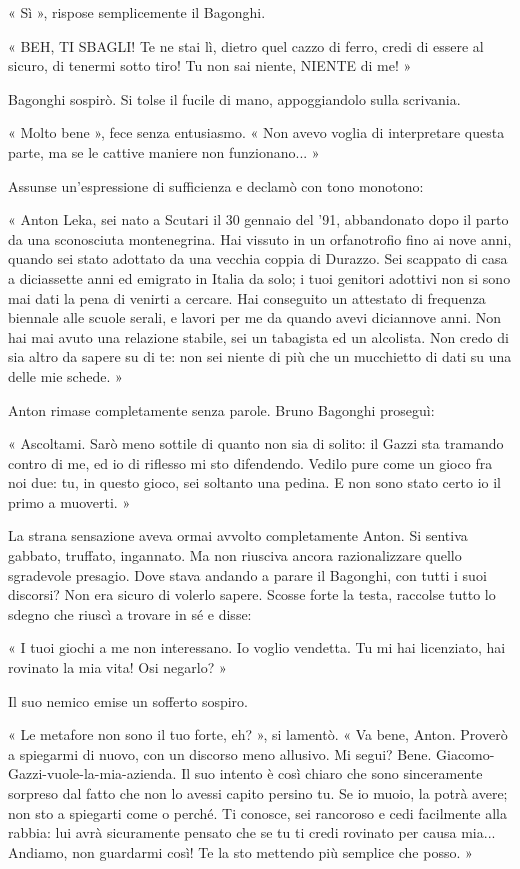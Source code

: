 « Sì », rispose semplicemente il Bagonghi.

« BEH, TI SBAGLI! Te ne stai lì, dietro quel cazzo di ferro, credi di essere al sicuro, di tenermi sotto tiro! Tu non sai niente, NIENTE di me! »

Bagonghi sospirò. Si tolse il fucile di mano, appoggiandolo sulla scrivania.

« Molto bene », fece senza entusiasmo. « Non avevo voglia di interpretare questa parte, ma se le cattive maniere non funzionano... »

Assunse un'espressione di sufficienza e declamò con tono monotono:

« Anton Leka, sei nato a Scutari il 30 gennaio del '91, abbandonato dopo il parto da una sconosciuta montenegrina. Hai vissuto in un orfanotrofio fino ai nove anni, quando sei stato adottato da una vecchia coppia di Durazzo. Sei scappato di casa a diciassette anni ed emigrato in Italia da solo; i tuoi genitori adottivi non si sono mai dati la pena di venirti a cercare. Hai conseguito un attestato di frequenza biennale alle scuole serali, e lavori per me da quando avevi diciannove anni. Non hai mai avuto una relazione stabile, sei un tabagista ed un alcolista. Non credo di sia altro da sapere su di te: non sei niente di più che un mucchietto di dati su una delle mie schede. »

Anton rimase completamente senza parole. Bruno Bagonghi proseguì:

« Ascoltami. Sarò meno sottile di quanto non sia di solito: il Gazzi sta tramando contro di me, ed io di riflesso mi sto difendendo. Vedilo pure come un gioco fra noi due: tu, in questo gioco, sei soltanto una pedina. E non sono stato certo io il primo a muoverti. »

La strana sensazione aveva ormai avvolto completamente Anton. Si sentiva gabbato, truffato, ingannato. Ma non riusciva ancora razionalizzare quello sgradevole presagio. Dove stava andando a parare il Bagonghi, con tutti i suoi discorsi? Non era sicuro di volerlo sapere. Scosse forte la testa, raccolse tutto lo sdegno che riuscì a trovare in sé e disse:

« I tuoi giochi a me non interessano. Io voglio vendetta. Tu mi hai licenziato, hai rovinato la mia vita! Osi negarlo? »

Il suo nemico emise un sofferto sospiro.

« Le metafore non sono il tuo forte, eh? », si lamentò. « Va bene, Anton. Proverò a spiegarmi di nuovo, con un discorso meno allusivo. Mi segui? Bene. Giacomo-Gazzi-vuole-la-mia-azienda. Il suo intento è così chiaro che sono sinceramente sorpreso dal fatto che non lo avessi capito persino tu. Se io muoio, la potrà avere; non sto a spiegarti come o perché. Ti conosce, sei rancoroso e cedi facilmente alla rabbia: lui avrà sicuramente pensato che se tu ti credi rovinato per causa mia... Andiamo, non guardarmi così! Te la sto mettendo più semplice che posso. »

